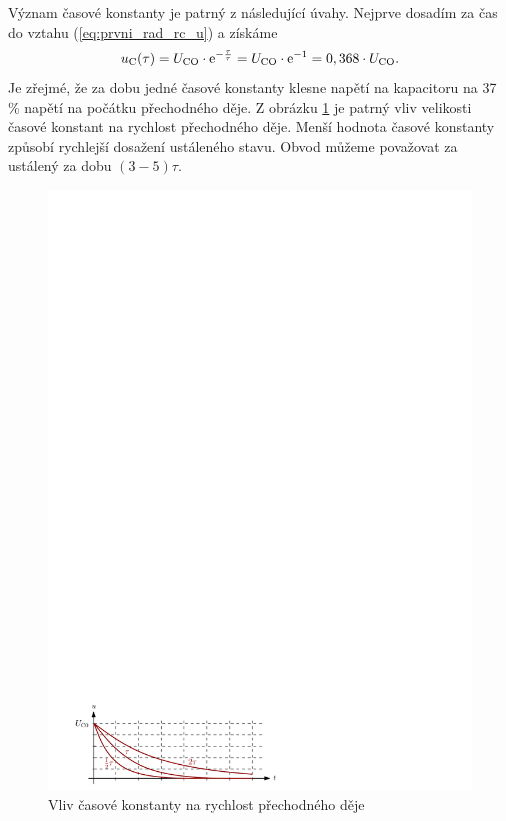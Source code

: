Význam časové konstanty je patrný z následující úvahy. Nejprve dosadím za čas do vztahu (\ref{eq:prvni_rad_rc_u}) a získáme
$$
u_\mathrm{C}(\tau) = U_\mathrm{CO} \cdot \mathrm{e}^{-\frac{\tau}{\tau}} = U_\mathrm{CO} \cdot \mathrm{e}^{-1} = 0,368 \cdot U_\mathrm{CO}.
$$
Je zřejmé, že za dobu jedné časové konstanty klesne napětí na kapacitoru na 37 \% napětí na počátku přechodného děje. Z obrázku \ref{fig:prvni_rad_rc_graf_tau} je patrný vliv velikosti časové konstant na rychlost přechodného děje. Menší hodnota časové konstanty způsobí rychlejší dosažení ustáleného stavu. Obvod můžeme považovat za ustálený za dobu $(3-5)\tau$.
\begin{figure}[h!]
\centering
\includegraphics[]{prechodne_jevy/prvni_rad/rc_graf_tau.pdf}
\caption{Vliv časové konstanty na rychlost přechodného děje}
\label{fig:prvni_rad_rc_graf_tau}
\end{figure}

